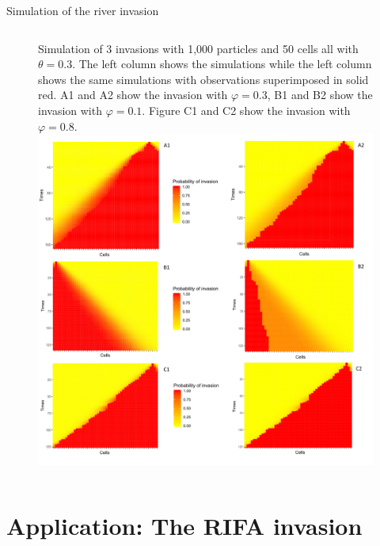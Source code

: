 \documentclass[9pt, xcolor={dvipsnames,svgnames,table}]{beamer}
\begin{document}
\begin{frame}{Simulation of the river invasion}
    \begin{figure}
        \begin{columns}
            Simulation of 3 invasions with 1,000 particles and 50 cells all with $\theta = 0.3$. The left column shows the simulations while the left column shows the same simulations with observations superimposed in solid red. A1 and A2 show the invasion with $\varphi = 0.3$, B1 and B2 show the invasion with $\varphi = 0.1$. Figure C1 and C2 show the invasion with $\varphi = 0.8$.
            \label{fig:2}
            \includegraphics[width=\textwidth]{Thesis/river_007.png}
        \end{columns}
    \end{figure}
\end{frame}




\section{Application: The RIFA invasion}
\end{document}
